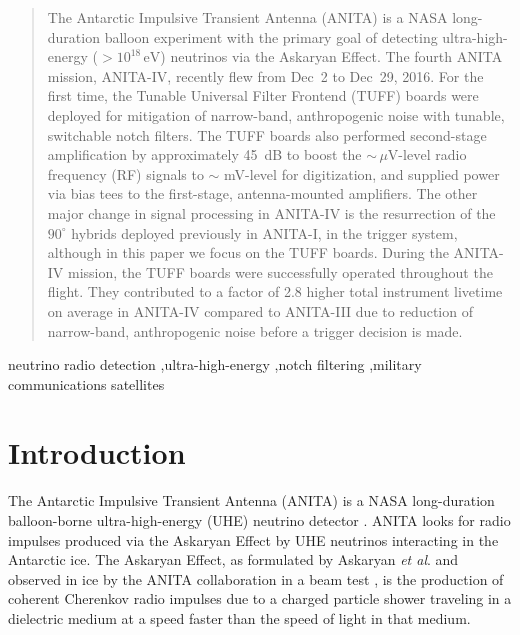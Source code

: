 \documentclass[preprint,12pt]{elsarticle}
\begin{document}
\begin{frontmatter}
\begin{abstract}

The Antarctic Impulsive Transient Antenna (ANITA) is a NASA long-duration balloon experiment 
with the primary goal of detecting ultra-high-energy ($>10^{18}\,\mbox{eV}$) neutrinos via the Askaryan Effect. 
The fourth ANITA mission, ANITA-IV, recently flew from Dec~2 to Dec~29, 2016. 
For the first time, 
the Tunable Universal Filter Frontend (TUFF) boards were deployed
for mitigation of narrow-band, anthropogenic noise with tunable, switchable notch filters. 
The TUFF boards also performed second-stage amplification by approximately
45~dB to boost the $\sim\,\mu\mbox{V-level}$ radio frequency (RF) signals to $\sim$ mV-level for digitization, and 
supplied power via bias tees to the first-stage, antenna-mounted amplifiers. 
The other major change in signal processing in ANITA-IV is the resurrection of the
$90^{\circ}$ hybrids deployed previously in ANITA-I, in the trigger system, although in this paper we focus on the TUFF boards.
During the ANITA-IV mission, the TUFF boards were successfully operated throughout the flight. 
They contributed to 
a factor of 2.8
higher total instrument livetime on average in ANITA-IV compared to ANITA-III
due to reduction of narrow-band, anthropogenic noise before a trigger decision is made. 

\end{abstract}

\begin{keyword}
neutrino radio detection \sep ultra-high-energy \sep notch filtering \sep military communications satellites 

\end{keyword}

\end{frontmatter}

\linenumbers

\section{Introduction}

The Antarctic Impulsive Transient Antenna (ANITA) is a NASA long-duration balloon-borne ultra-high-energy (UHE) neutrino detector \cite{instrPaper}.
ANITA looks for radio impulses produced via the Askaryan Effect by UHE neutrinos interacting in the Antarctic ice.
The Askaryan Effect, as formulated by Askaryan \textit{et al}. \cite{askaryan} and observed in ice by the ANITA collaboration in a beam test \cite{askaryan_observation}, is the production of coherent Cherenkov radio impulses due to a 
charged particle shower traveling in a dielectric medium at a speed faster than the speed of light in that medium.
\end{document}
